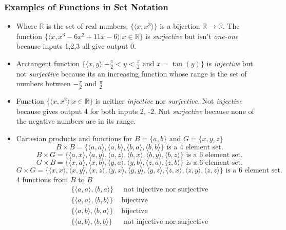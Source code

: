 \subsubsection{Examples of Functions in Set Notation}
\begin{itemize}
	\item Where $\mathbb{R}$ is the set of real numbers, $\{\langle x, x^3
		      \rangle\}$ is a bijection $\mathbb{R} \to \mathbb{R}$. The function
	      $\{\langle x, x^3 - 6x^2 + 11x - 6 \rangle | x \in \mathbb{R}\}$ is
	      \textit{surjective} but isn't \textit{one-one} because inputs 1,2,3
	      all give output 0.
	\item Arctangent function $\{\langle x,y \rangle | -\frac{\pi}{2} < y <
		      \frac{\pi}{2} \text{ and } x = \tan(y)\}$ is \textit{injective} but
	      not \textit{surjective} because its an increasing function whose range
	      is the set of numbers between $-\frac{\pi}{2}$ and $\frac{\pi}{2}$
	\item Function $\{\langle x,x^2 \rangle | x \in \mathbb{R}\}$ is neither
	      \textit{injective} nor \textit{surjective}. Not \textit{injective}
	      because gives output 4 for both inputs 2, -2. Not \textit{surjective}
	      because none of the negative numbers are in its range.
	\item Cartesian products and functions for $B = \{a,b\}$ and $G = \{x,y,z\}$
	      \[
		      B \times B = \{ \langle a,a \rangle, \langle a,b \rangle, \langle
		      b,a \rangle, \langle b,b \rangle \} \text{ is a 4 element set} .\]
	      \[
		      B \times G = \{ \langle a,x \rangle, \langle a,y \rangle, \langle
		      a,z \rangle, \langle b,x \rangle, \langle b,y \rangle, \langle b,z
		      \rangle \} \text{ is a 6 element set}
		      .\]
	      \[
		      G \times B = \{ \langle x,a \rangle, \langle x,b \rangle, \langle
		      y,a \rangle, \langle y,b \rangle, \langle z,a \rangle, \langle z,b
		      \rangle \} \text{ is a 6 element set}
		      .\]
	      \[
		      G \times G = \{ \langle x,x \rangle, \langle x,y \rangle, \langle
		      x,z \rangle, \langle y,x \rangle, \langle y,y \rangle, \langle y,z
		      \rangle, \langle z,x \rangle, \langle z,y \rangle, \langle z,z
		      \rangle\} \text{ is a 6 element set}
		      .\]
	      4 functions from $B$ to $B$
	      \begin{align*}
		      \{ \langle a,a \rangle, \langle b, a \rangle \} & \; \text{ not injective nor
		      surjective}                                                                   \\
		      \{ \langle a,a \rangle, \langle b,b \rangle \}  & \; \text{
		      bijective}                                                                    \\
		      \{ \langle a,b \rangle, \langle b,a \rangle \}  & \; \text{
		      bijective}                                                                    \\
		      \{ \langle a,b \rangle, \langle b,b \rangle \}  & \; \text{ not
			      injective nor surjective}
	      \end{align*}
\end{itemize}
